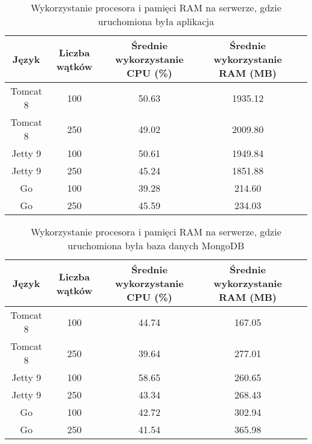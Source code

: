 
\begin{table}[!htb]
\centering
\caption{Wykorzystanie procesora i pamięci RAM na serwerze, gdzie uruchomiona była aplikacja}
\label{tab:app-clean-key}
\begin{tabular}{@{}ccccl@{}}
\toprule
\textbf{Język} & \textbf{Liczba wątków} & \multicolumn{1}{p{3cm}}{\textbf{Średnie wykorzystanie CPU (\%)}} & \multicolumn{1}{p{3cm}}{\textbf{Średnie wykorzystanie RAM (MB)}} &  \\ \midrule
Tomcat 8       & 100                    & 50.63                             & 1935.12                          &  \\
Tomcat 8       & 250                    & 49.02                             & 2009.80                         &  \\
Jetty 9       & 100                    & 50.61                             & 1949.84                          &  \\
Jetty 9       & 250                    & 45.24                             & 1851.88                          &  \\
Go       & 100                    & 39.28                             & 214.60                          &  \\
Go       & 250                    & 45.59                             & 234.03                          &  \\
\bottomrule
\end{tabular}
\end{table}


\begin{table}[!htb]
\centering
\caption{Wykorzystanie procesora i pamięci RAM na serwerze, gdzie uruchomiona była baza danych MongoDB}
\label{tab:mongo-clean-key}
\begin{tabular}{@{}ccccl@{}}
\toprule
\textbf{Język} & \textbf{Liczba wątków} & \multicolumn{1}{p{3cm}}{\textbf{Średnie wykorzystanie CPU (\%)}} & \multicolumn{1}{p{3cm}}{\textbf{Średnie wykorzystanie RAM (MB)}} &  \\ \midrule
Tomcat 8       & 100                    & 44.74                             & 167.05                          &  \\
Tomcat 8       & 250                    & 39.64                             & 277.01                          &  \\
Jetty 9       & 100                    & 58.65                             & 260.65                          &  \\
Jetty 9       & 250                    & 43.34                             & 268.43                          &  \\
Go       & 100                    & 42.72                             & 302.94                          &  \\
Go       & 250                    & 41.54                             & 365.98                          &  \\
\bottomrule
\end{tabular}
\end{table}

